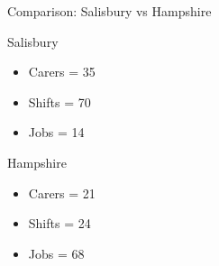 \documentclass[usenames,dvipsnames]{beamer}
\begin{document}
\begin{frame}{Comparison: Salisbury vs Hampshire}
	\small
	\begin{multicols}{2}	
		\begin{block}{Salisbury}
			\begin{itemize}
				\item Carers = 35
				\item Shifts = 70
				\item Jobs = 14
			\end{itemize}
		\end{block}
		\begin{block}{Hampshire}
			\begin{itemize}
				\item Carers = 21
				\item Shifts = 24
				\item Jobs = 68
			\end{itemize}
		\end{block}
	\end{multicols}	
\end{frame}
\end{document}
